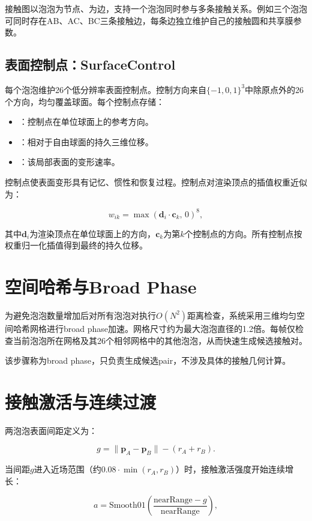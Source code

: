 接触图以泡泡为节点、为边，支持一个泡泡同时参与多条接触关系。例如三个泡泡可同时存在AB、AC、BC三条接触边，每条边独立维护自己的接触圆和共享膜参数。

\subsection{表面控制点：SurfaceControl}

每个泡泡维护26个低分辨率表面控制点。控制方向来自$\{-1,0,1\}^3$中除原点外的26个方向，均匀覆盖球面。每个控制点存储：

\begin{itemize}
  \item {}：控制点在单位球面上的参考方向。
  \item {}：相对于自由球面的持久三维位移。
  \item {}：该局部表面的变形速率。
\end{itemize}

控制点使表面变形具有记忆、惯性和恢复过程。控制点对渲染顶点的插值权重近似为：

\[
w_{ik} = \max(\mathbf{d}_i \cdot \mathbf{c}_k,\, 0)^{8},
\]

其中$\mathbf{d}_i$为渲染顶点在单位球面上的方向，$\mathbf{c}_k$为第$k$个控制点的方向。所有控制点按权重归一化插值得到最终的持久位移。

\section{空间哈希与Broad Phase}

为避免泡泡数量增加后对所有泡泡对执行$O(N^2)$距离检查，系统采用三维均匀空间哈希网格进行broad phase加速。网格尺寸约为最大泡泡直径的1.2倍。每帧仅检查当前泡泡所在网格及其26个相邻网格中的其他泡泡，从而快速生成候选接触对。

该步骤称为broad phase，只负责生成候选pair，不涉及具体的接触几何计算。

\section{接触激活与连续过渡}

两泡泡表面间距定义为：

\[
g = \|\mathbf{p}_A - \mathbf{p}_B\| - (r_A + r_B).
\]

当间距$g$进入近场范围（约$0.08 \cdot \min(r_A, r_B)$）时，接触激活强度开始连续增长：

\[
a = \mathrm{Smooth01}\!\left(\frac{\mathrm{nearRange} - g}{\mathrm{nearRange}}\right),
\]

